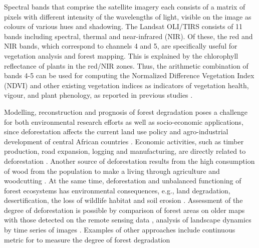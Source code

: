 \documentclass[applsci,article,submit,pdftex,moreauthors]{Definitions/mdpi}
\begin{document}
Spectral bands that comprise the satellite imagery each consists of a matrix of pixels with different intensity of the wavelengths of light, visible on the image as colours of various hues and shadowing. The Landsat OLI/TIRS consists of 11 bands including spectral, thermal and near-infrared (NIR). Of these, the red and NIR bands, which correspond to channels 4 and 5, are specifically useful for vegetation analysis and forest mapping. This is explained by the chlorophyll reflectance of plants in the red/NIR zones. Thus, the arithmetic combination of bands 4-5 can be used for computing the Normalized Difference Vegetation Index (NDVI) and other existing vegetation indices as indicators of vegetation health, vigour, and plant phenology, as reported in previous studies \cite{SOUDANI2012234,Lemenkova202019,1026428,HMIMINA2013145}.

Modelling, reconstruction and prognosis of forest degradation poses a challenge for both environmental research efforts as well as socio-economic applications, since deforestation affects the current land use policy and agro-industrial development of central African countries \cite{TEGEGNE2016312,f13091508}. Economic activities, such as timber production, road expansion, logging and manufacturing, are directly related to deforestation \cite{BRANDT201615,TRITSCH2020106660,Lietal2015}. Another source of deforestation results from the high consumption of wood from the population to make a living through agriculture and woodcutting \cite{Iloweka}. At the same time, deforestation and unbalanced functioning of forest ecosystems has environmental consequences, e.g., land degradation, desertification, the loss of wildlife habitat and soil erosion \cite{AQUILAS2022100553}. Assessment of the degree of deforestation is possible by comparison of forest areas on older maps with those detected on the remote sensing data \cite{rs12040638,land10101042,Zhangetal2005}, analysis of landscape dynamics by time series of images \cite{land11091541}. Examples of other approaches include continuous metric for to measure the degree of forest degradation \cite{SHAPIRO2021107268}
 
\end{document}
